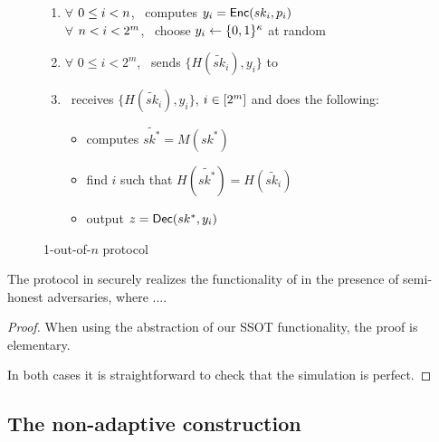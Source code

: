 \begin{figure}[h]
{\begin{minipage}{0.95\linewidth}
\begin{enumerate}
				\item  $\forall$ $0\leq i < n$, \SS\ computes $y_i = \mathsf{Enc}(sk_i, p_i)$
				 \\$\forall$ $n < i < 2^m$, \SS\ choose $y_i \leftarrow\{0,1\}^\kappa$ at random
				 \item $\forall$ $0\leq i < 2^m$, \SS\ sends $\{H(\tilde{sk}_{i}), y_i\}$ to \RR\
				\item \RR\ receives $\{H(\tilde{sk}_{i}), y_i\}$, $i\in[2^{m}]$ and does the following: 
				\begin{itemize}
					\item computes $\tilde{sk^*} = M(sk^*)$
					\item find $i$ such that $H(\tilde{sk^*})= H(\tilde{sk_i})$
					\item output $z=\mathsf{Dec}(sk^*, y_i)$
				\end{itemize}
				
			
			\end{enumerate}
			
			
		\end{minipage}
	}
	\caption{1-out-of-$n$ \SSOT protocol}
	\label{fig:Cons1ssot}
\end{figure}





\begin{theorem}
\label{thm:sot}
The \SSOT protocol in  securely realizes the  functionality of  in the presence of semi-honest adversaries, where ....
\end{theorem}


\begin{proof}
%
When using the abstraction of our SSOT functionality, the proof is elementary.

In both cases it is straightforward to check that the simulation is perfect.
\end{proof}

\subsection{The non-adaptive \SSOT construction}
\label{sect:constrnSSOT}
 